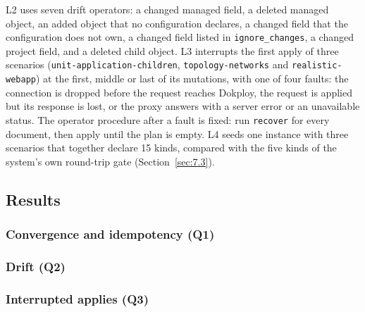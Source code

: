 L2 uses seven drift operators: a changed managed field, a deleted managed object, an added object that
no configuration declares, a changed field that the configuration does not own, a changed field
listed in \texttt{ignore\_changes}, a changed project field, and a deleted child object. L3 interrupts the
first apply of three scenarios (\texttt{unit-application-children}, \texttt{topology-networks} and
\texttt{realistic-webapp}) at the first, middle or last of its mutations, with one of four faults: the
connection is dropped before the request reaches Dokploy, the request is applied but its response is
lost, or the proxy answers with a server error or an unavailable status. The operator procedure after
a fault is fixed: run \texttt{recover} for every document, then apply until the plan is empty. L4 seeds one
instance with three scenarios that together declare 15 kinds, compared with the five kinds of the
system's own round-trip gate (Section~\ref{sec:7.3}).

\subsection{Results}\label{sec:9.3}

\subsubsection*{Convergence and idempotency (Q1)}



\subsubsection*{Drift (Q2)}


\subsubsection*{Interrupted applies (Q3)}

